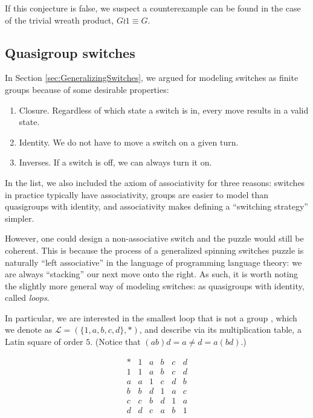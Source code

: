 If this conjecture is false, we suspect a counterexample can be found in the
case of the trivial wreath product, $G \wr \mathrm{1} \equiv G$.

\subsection{Quasigroup switches}
\label{sub:quasigroupSwitches}
In Section \ref{sec:GeneralizingSwitches}, we argued for modeling switches as
finite groups because of some desirable properties: \begin{enumerate}
  \item Closure. Regardless of which state a switch is in, every move results
    in a valid state.
  \item Identity. We do not have to move a switch on a given turn.
  \item Inverses. If a switch is off, we can always turn it on.
\end{enumerate}

In the list, we also included the axiom of associativity for three reasons:
switches in practice typically have associativity,
groups are easier to model than quasigroups with identity, and
associativity makes defining a ``switching strategy'' simpler.

However, one could design a non-associative switch and the puzzle would still
be coherent. This is because the process of
a generalized spinning switches puzzle is naturally
``left associative'' in the language of programming language theory:
we are always ``stacking'' our next move onto the right.
As such, it is worth noting the slightly more general way of modeling switches:
as quasigroups with identity, called \textit{loops}.

In particular, we are interested in the smallest loop that is not a group
\cite{MSELoop}, which we denote as
$\mathcal{L} = (\{1, a, b, c, d\}, \ast)$,
and describe via its multiplication table, a Latin square of order $5$.
(Notice that $(ab)d = a \neq d = a(bd)$.)
\begin{singlespace}
\begin{equation}
  \begin{array}{c|ccccc}
    \ast & 1 & a & b & c & d \\
    \hline
      1 & 1 & a & b & c & d \\
      a & a & 1 & c & d & b \\
      b & b & d & 1 & a & c \\
      c & c & b & d & 1 & a \\
      d & d & c & a & b & 1
  \end{array}
\end{equation}
\end{singlespace}

